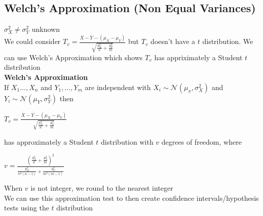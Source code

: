 \documentclass{article}
\begin{document}
\subsection{Welch's Approximation (Non Equal Variances)}
\label{sec:notEqualV}
$\sigma_X^2\neq\sigma_Y^2$ unknown\\
We could consider $T_v=\frac{\overline{X}-\overline{Y}-(\mu_X-\mu_Y)}{\sqrt{\frac{S_X^2}{n}+\frac{S_Y^2}{m}}}$ but $T_v$ doesn't have a $t$ distribution. We can use Welch's Approximation which shows $T_v$ has appriximately a Student $t$ distribution\\
\textbf{Welch's Approximation}\\
If $X_1\dots,X_n$ and $Y_1,\dots,Y_m$ are independent with $X_i\sim\mathcal{N}(\mu_x,\sigma^2_X)$ and $Y_i\sim\mathcal{N}(\mu_Y,\sigma^2_Y)$ then
\begin{center}
    $T_v=\frac{\overline{X}-\overline{Y}-(\mu_X-\mu_Y)}{\sqrt{\frac{S_X^2}{n}+\frac{S_Y^2}{m}}}$
\end{center}
has approximately a Student $t$ distribution with $v$ degrees of freedom, where
\begin{center}
    $v=\frac{(\frac{S_X^2}{n}+\frac{S_Y^2}{m})^2}{\frac{S_X^4}{n^2(n-1)}+\frac{S_Y^4}{m^2(m-1)}}$
\end{center}
When $v$ is not integer, we round to the nearest integer\\
We can use this approximation test to then create confidence intervals/hypothesis tests using the $t$ distribution
\end{document}
